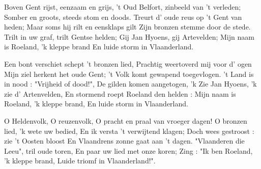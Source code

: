 \footnotemark [
ititle={Klokke Roeland}]


\beginverse
Boven Gent rijst, eenzaam en grijs,
't Oud Belfort, zinbeeld van 't verleden;
Somber en groots, steeds stom en doods.
Treurt d' oude reus op 't Gent van heden;
Maar soms hij rilt en eensklaps gilt
Zijn bronzen stemme door de stede.
Trilt in uw graf, trilt Gentse helden;
Gij Jan Hyoens, gij Artevelden;
Mijn naam is Roeland, 'k kleppe brand
En luide storm in Vlaanderland.
\endverse

\beginverse
Een bont verschiet schept 't bronzen lied,
Prachtig weertoverd mij voor d' ogen
Mijn ziel herkent het oude Gent;
't Volk komt gewapend toegevlogen.
't Land is in nood : "Vrijheid of dood!",
De gilden komen aangetogen,
'k Zie Jan Hyoens, 'k zie d' Artenvelden,
En stormend roept Roeland den helden :
Mijn naam is Roeland, 'k kleppe brand,
En luide storm in Vlaanderland.
\endverse

\beginverse
O Heldenvolk, O reuzenvolk,
O pracht en praal van vroeger dagen!
O bronzen lied, 'k wete uw bedied,
En ik versta 't verwijtend klagen;
Doch wees gestroost : zie 't Oosten bloost
En Vlaandrens zonne gaat aan 't dagen.
"Vlaanderen die Leeu", tril oude toren,
En paar uw lied met onze koren;
Zing : "Ik ben Roeland, 'k kleppe brand,
Luide triomf in Vlaanderland!".
\endverse
\endsong